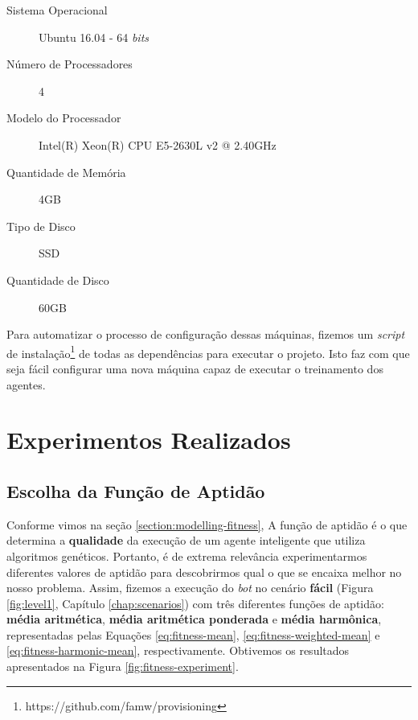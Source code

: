\begin{description}
    \item [Sistema Operacional] Ubuntu 16.04 - 64 \textit{bits}
    \item [Número de Processadores] 4
    \item [Modelo do Processador] Intel(R) Xeon(R) CPU E5-2630L v2 @ 2.40GHz
    \item [Quantidade de Memória] 4GB
    \item [Tipo de Disco] SSD
    \item [Quantidade de Disco] 60GB
\end{description}

Para automatizar o processo de configuração dessas máquinas, fizemos um
\textit{script} de instalação\footnote{https://github.com/famw/provisioning} de
todas as dependências para executar o projeto. Isto faz com que seja fácil
configurar uma nova máquina capaz de executar o treinamento dos agentes.


\section{\label{section:experiments}Experimentos Realizados}

\subsection{\label{section:fitness-experiment}Escolha da Função de Aptidão}
Conforme vimos na seção \ref{section:modelling-fitness}, A função de aptidão é o
que determina a \textbf{qualidade} da execução de um agente inteligente que
utiliza algoritmos genéticos. Portanto, é de extrema relevância experimentarmos
diferentes valores de aptidão para descobrirmos qual o que se encaixa melhor no
nosso problema. Assim, fizemos a execução do \textit{bot} no cenário
\textbf{fácil} (Figura \ref{fig:level1}, Capítulo \ref{chap:scenarios}) com três
diferentes funções de aptidão: \textbf{média aritmética}, \textbf{média
aritmética ponderada} e \textbf{média harmônica}, representadas pelas Equações
\ref{eq:fitness-mean}, \ref{eq:fitness-weighted-mean} e
\ref{eq:fitness-harmonic-mean}, respectivamente. Obtivemos os resultados
apresentados na Figura \ref{fig:fitness-experiment}.

